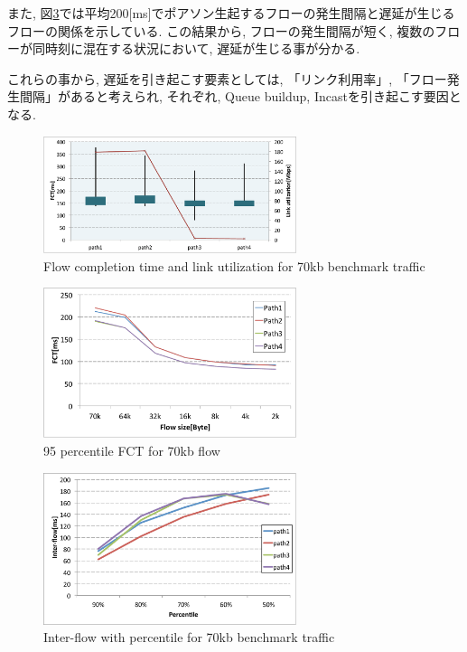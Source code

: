 \documentclass[10pt, a4paper, twocolumn]{jsarticle}
\begin{document}
また, 図\ref{fig:inter-flow}では平均200[ms]でポアソン生起するフローの発生間隔と遅延が生じるフローの関係を示している.
この結果から, フローの発生間隔が短く, 複数のフローが同時刻に混在する状況において, 遅延が生じる事が分かる.

これらの事から, 遅延を引き起こす要素としては, 「リンク利用率」, 「フロー発生間隔」があると考えられ, それぞれ, Queue buildup,
Incastを引き起こす要因となる.

\begin{figure}[h]
    \begin{center}
    \includegraphics[autoebb, width=210pt]{./img/70kb_fix.pdf}
    \caption{Flow completion time and link utilization for 70kb benchmark
    traffic}
    \label{fig:improve}
    \end{center}
\end{figure}

\begin{figure}[h]
    \begin{center}
    \includegraphics[autoebb, width=210pt]{./img/95percentile.pdf}
    \caption{95 percentile FCT for 70kb flow}
    \label{fig:95percentile}
    \end{center}
\end{figure}

\begin{figure}[h]
    \begin{center}
    \includegraphics[autoebb, width=210pt]{./img/inter_flow.pdf}
    \caption{Inter-flow with percentile for 70kb benchmark
    traffic}
    \label{fig:inter-flow}
    \end{center}
\end{figure}
\end{document}
